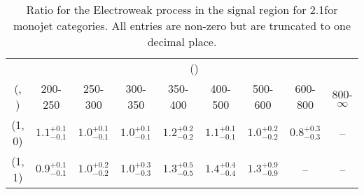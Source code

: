 \begin{table}[h!]
\tiny
\centering
\caption{Ratio for the Electroweak process in the signal region for 2.1\ifb for monojet categories. All entries are non-zero but are truncated to one decimal place.\label{tab:ratiosep_sig_ewk_mono}}
\begin{tabular}
{ccccccccc}
	\hline\hline
	& \multicolumn{8}{c}{\scalht (\gev)} \\ 
	 (\njet,  \nb) & 200-250 & 250-300 & 300-350 & 350-400 & 400-500 & 500-600 & 600-800 & 800-$\infty$ \\ [0.8ex] 
\hline
	(1, 0) & $1.1^{+ 0.1 }_{- 0.1 }$ & $1.0^{+ 0.1 }_{- 0.1 }$ & $1.0^{+ 0.1 }_{- 0.1 }$ & $1.2^{+ 0.2 }_{- 0.2 }$ & $1.1^{+ 0.1 }_{- 0.1 }$ & $1.0^{+ 0.2 }_{- 0.2 }$ & $0.8^{+ 0.3 }_{- 0.3 }$ & -- \\[0.5ex] 
	(1, 1) & $0.9^{+ 0.1 }_{- 0.1 }$ & $1.0^{+ 0.2 }_{- 0.2 }$ & $1.0^{+ 0.3 }_{- 0.3 }$ & $1.3^{+ 0.5 }_{- 0.5 }$ & $1.4^{+ 0.4 }_{- 0.4 }$ & $1.3^{+ 0.9 }_{- 0.9 }$ & -- & -- \\[0.5ex] 
	\hline
	\hline
\end{tabular}
\end{table}
